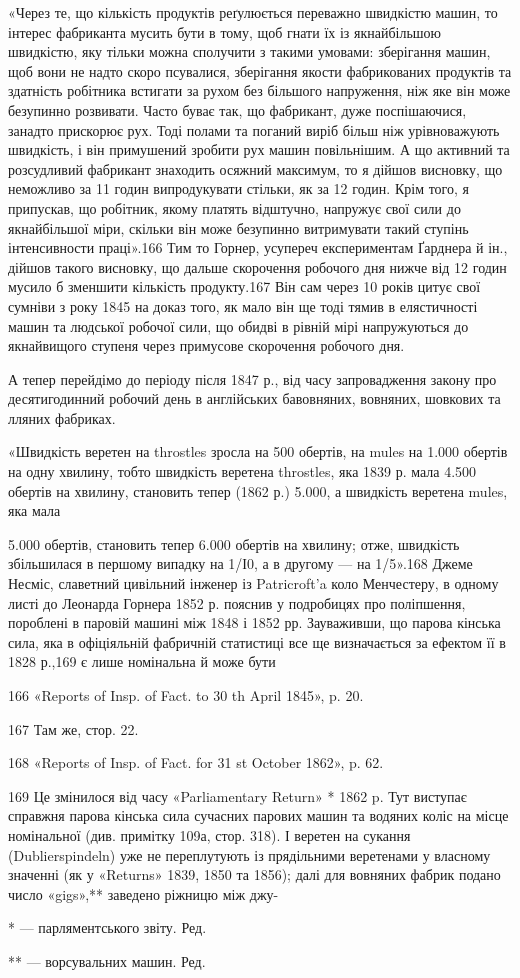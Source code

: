 «Через те, що кількість продуктів реґулюється переважно
швидкістю машин, то інтерес фабриканта мусить бути в тому,
щоб гнати їх із якнайбільшою швидкістю, яку тільки можна
сполучити з такими умовами: зберігання машин, щоб вони не
надто скоро псувалися, зберігання якости фабрикованих продуктів
та здатність робітника встигати за рухом без більшого напруження,
ніж яке він може безупинно розвивати. Часто буває так,
що фабрикант, дуже поспішаючися, занадто прискорює рух.
Тоді полами та поганий виріб більш ніж урівноважують швидкість,
і він примушений зробити рух машин повільнішим. А що
активний та розсудливий фабрикант знаходить осяжний максимум,
то я дійшов висновку, що неможливо за 11 годин випродукувати
стільки, як за 12 годин. Крім того, я припускав, що робітник,
якому платять відштучно, напружує свої сили до якнайбільшої
міри, скільки він може безупинно витримувати такий
ступінь інтенсивности праці».166 Тим то Горнер, усупереч експериментам
Ґарднера й ін., дійшов такого висновку, що дальше скорочення
робочого дня нижче від 12 годин мусило б зменшити
кількість продукту.167 Він сам через 10 років цитує свої сумніви
з року 1845 на доказ того, як мало він ще тоді тямив в елястичності
машин та людської робочої сили, що обидві в рівній мірі
напружуються до якнайвищого ступеня через примусове скорочення
робочого дня.

А тепер перейдімо до періоду після 1847 р., від часу запровадження
закону про десятигодинний робочий день в англійських
бавовняних, вовняних, шовкових та лляних фабриках.

«Швидкість веретен на throstles зросла на 500 обертів, на
mules на 1.000 обертів на одну хвилину, тобто швидкість веретена
throstles, яка 1839 р. мала 4.500 обертів на хвилину, становить
тепер (1862 р.) 5.000, а швидкість веретена mules, яка мала

5.000 обертів, становить тепер 6.000 обертів на хвилину; отже,
швидкість збільшилася в першому випадку на 1/І0, а в другому —
на 1/5».168 Джеме Несміс, славетний цивільний інженер із
Patricroft’a коло Менчестеру, в одному листі до Леонарда Горнера
1852 р. пояснив у подробицях про поліпшення, пороблені в паровій
машині між 1848 і 1852 рр. Зауваживши, що парова кінська
сила, яка в офіціяльній фабричній статистиці все ще визначається
за ефектом її в 1828 р.,169 є лише номінальна й може бути

166 «Reports of Insp. of Fact. to 30 th April 1845», p. 20.

167    Там же, стор. 22.

168 «Reports of Insp. of Fact. for 31 st October 1862», p. 62.

169 Це змінилося від часу «Parliamentary Return» * 1862 p. Тут
виступає справжня парова кінська сила сучасних парових машин та водяних
коліс на місце номінальної (див. примітку 109а, стор. 318). І веретен
на сукання (Dublierspindeln) уже не переплутують із прядільними веретенами
у власному значенні (як у «Returns» 1839, 1850 та 1856); далі
для вовняних фабрик подано число «gigs»,** заведено ріжницю між джу-

* — парляментського звіту. Ред.

** — ворсувальних машин. Ред.
